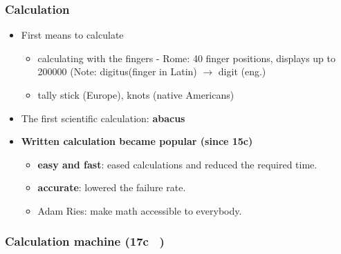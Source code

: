 \documentclass{standalone}
\begin{document}
\subsubsection*{Calculation}

\begin{itemize}
	\item First means to calculate
		\begin{itemize}
			\item calculating with the fingers - Rome: 40 finger positions, displays up to 200000 (Note: digitus(finger in Latin) $\rightarrow$ digit (eng.)
			\item tally stick (Europe), knots (native Americans)
		\end{itemize}
	\item The first scientific calculation: \textbf{abacus} 
	\item \textbf{Written calculation became popular (since 15c)}
		\begin{itemize}
			\item \textbf{easy and fast}: eased calculations and reduced the required time.
			\item \textbf{accurate}: lowered the failure rate.
			\item Adam Ries: make math accessible to everybody.
		\end{itemize} 
\end{itemize}

\subsubsection*{Calculation machine (17c ~)}
\end{document}
